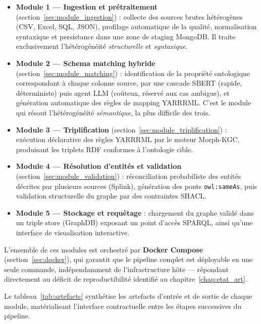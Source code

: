 \begin{itemize}
    \item \textbf{Module 1 — Ingestion et prétraitement}
          (section~\ref{sec:module_ingestion}) : collecte des sources
          brutes hétérogènes (CSV, Excel, SQL, JSON), profilage
          automatique de la qualité, normalisation syntaxique et
          persistance dans une zone de staging MongoDB. Il traite
          exclusivement l'hétérogénéité \textit{structurelle} et
          \textit{syntaxique}.
    \item \textbf{Module 2 — Schema matching hybride}
          (section~\ref{sec:module_matching}) : identification de la
          propriété ontologique correspondant à chaque colonne source,
          par une cascade SBERT (rapide, déterministe) puis agent LLM
          (coûteux, réservé aux cas ambigus), et génération automatique
          des règles de mapping YARRRML. C'est le module qui résout
          l'hétérogénéité \textit{sémantique}, la plus difficile des
          trois.
    \item \textbf{Module 3 — Triplification}
          (section~\ref{sec:module_triplification}) : exécution
          déclarative des règles YARRRML par le moteur Morph-KGC,
          produisant les triplets RDF conformes à l'ontologie cible.
    \item \textbf{Module 4 — Résolution d'entités et validation}
          (section~\ref{sec:module_validation}) : réconciliation
          probabiliste des entités décrites par plusieurs sources
          (Splink), génération des ponts \texttt{owl:sameAs}, puis
          validation structurelle du graphe par des contraintes SHACL.
    \item \textbf{Module 5 — Stockage et requêtage} : chargement du
          graphe validé dans un triple store (GraphDB) exposant un
          point d'accès SPARQL, ainsi qu'une interface de visualisation
          interactive.
\end{itemize}

\noindent L'ensemble de ces modules est orchestré par
\textbf{Docker Compose} (section~\ref{sec:docker}), qui garantit que le
pipeline complet est déployable en une seule commande, indépendamment de
l'infrastructure hôte — répondant directement au déficit de
reproductibilité identifié au chapitre~\ref{chap:etat_art}.

Le tableau~\ref{tab:artefacts} synthétise les artefacts d'entrée et de sortie
de chaque module, matérialisant l'interface contractuelle entre les étapes
successives du pipeline.

